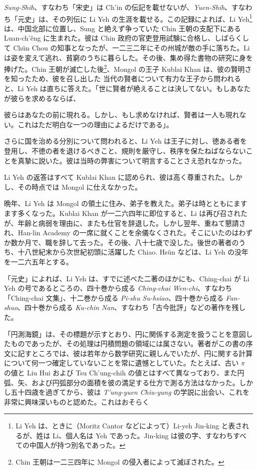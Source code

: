 \documentclass[11pt]{article}
\newcommand{\scanpage}[2]{\clearpage\setcounter{footnote}{0}\noindent{\footnotesize\color{gray}PDF #1 頁 · #2}\par\medskip}
\newcommand{\scanfooter}{}
\begin{document}
\emph{Sung-Shih}、すなわち「宋史」は Ch'in の伝記を載せないが、\emph{Yuen-Shih}、すなわち「元史」は、その列伝に Li Yeh の生涯を載せる。この記録によれば、Li Yeh\footnote{Li Yeh は、ときに（Moritz Cantor などによって）Li-yeh Jin-king と表されるが、姓は Li、個人名は Yeh であった。Jin-king は彼の字、すなわちすべての中国人が持つ別名であった。} は、中国北部に位置し、Sung と絶えず争っていた Chin 王朝の支配下にある Luan-ch'êng に生まれた。彼は Chin 政府の官吏登用試験に合格し、しばらくして Chün Chou の知事となったが、一二三二年にその州城が敵の手に落ちた。Li は姿を変えて逃れ、貧窮のうちに暮らした。その後、集め得た書物の研究に身を捧げた。Chin 王朝が滅亡した後\footnote{Chin 王朝は一二三四年に Mongol の侵入者によって滅ぼされた。}、Mongol の王子 Kublai Khan は、彼の賢明さを知ったため、彼を召し出した 当代の賢者について有力な王子から問われると、Li Yeh は直ちに答えた。「世に賢者が絶えることは決してない。もしあなたが彼らを求めるならば、
\scanfooter

\scanpage{0094}{第12章、印刷頁80}
彼らはあなたの前に現れる。しかし、もし求めなければ、賢者は一人も現れない。これはただ明白な一つの理由によるだけである」。

さらに国を治める分別について問われると、Li Yeh は王子に対し、徳ある者を登用し、不徳の者を退けるべきこと、規則を厳守し、秩序を保たねばならないことを真摯に説いた。彼は当時の弊害について明言することさえ恐れなかった。

Li Yeh の返答はすべて Kublai Khan に認められ、彼は高く尊重された。しかし、その時点では Mongol に仕えなかった。

晩年、Li Yeh は Mongol の領土に住み、弟子を教えた。弟子は時とともにますます多くなった。Kublai Khan が一二六四年に即位すると、Li は再び召されたが、年齢と病弱を理由に、またも仕官を辞退した。しかし翌年、重ねて懇請され、Han-lin Academy の一席に就くことを余儀なくされた。そこにいたのはわずか数か月で、職を辞して去った。その後、八十七歳で没した。後世の著者のうち、十八世紀末から次世紀初頭に活躍した Chiao. Hsün などは、Li Yeh の没年を一二六五年とする。

「元史」によれば、Li Yeh は、すでに述べた二著のほかにも、Ching-chai が Li Yeh の号であるところの、四十巻から成る \emph{Ching-chai Wen-chi}、すなわち「Ching-chai 文集」、十二巻から成る \emph{Pi-shu Su-hsiao}、四十巻から成る \emph{Fan-shuo}、四十巻から成る \emph{Ku-chin Nan}、すなわち「古今批評」などの著作を残した。

「円測海鏡」は、その標題が示すとおり、円に関係する測定を扱うことを意図したものであったが、その処理は円積問題の領域には属さない。著者がこの書の序文に記すところでは、彼は若年から数学研究に親しんでいたが、円に関する計算について何一つ確定していないことを常に遺憾としていた。たとえば、古い $\pi$ の値と Liu Hui および Tsu Ch'ung-chih の値とはすべて異なっており、また円弧、矢、および円弧部分の面積を彼の満足する仕方で測る方法はなかった。しかし五十四歳を過ぎてから、彼は \emph{T'ung-yuen Chiu-yung} の学説に出会い、これを非常に興味深いものと認めた。これはおそらく
\scanfooter
\end{document}
